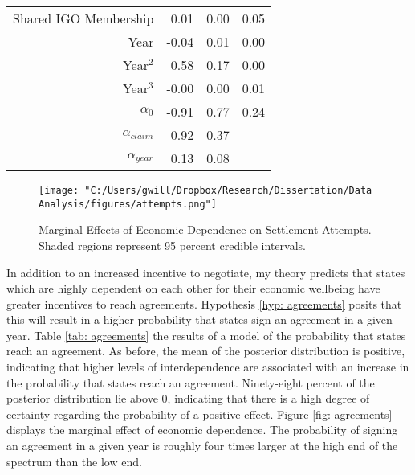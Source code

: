 \documentclass[../../dissertation.tex]{subfiles}
\begin{document}
\begin{table}[ht]
\begin{tabular}{rrrr}
Shared IGO Membership & 0.01 & 0.00 & 0.05 \\ 

Year & -0.04 & 0.01 & 0.00 \\ 

Year$^2$ & 0.58 & 0.17 & 0.00 \\ 

Year$^3$ & -0.00 & 0.00 & 0.01 \\ 

$\alpha_0$ & -0.91 & 0.77 & 0.24 \\ 

$\alpha_{claim}$ & 0.92 & 0.37 &  \\ 

$\alpha_{year}$ & 0.13 & 0.08 &  \\ 

\bottomrule

\end{tabular}

\end{table}



\begin{figure}
	\caption{Marginal Effects of Economic Dependence on Settlement Attempts. Shaded regions represent 95 percent credible intervals.}
	\label{fig: attempts}
	\texttt{[image: "C:/Users/gwill/Dropbox/Research/Dissertation/Data Analysis/figures/attempts.png"]}
\end{figure}

In addition to an increased incentive to negotiate, my theory predicts that states which are highly dependent on each other for their economic wellbeing have greater incentives to reach agreements. Hypothesis \ref{hyp: agreements} posits that this will result in a higher probability that states sign an agreement in a given year. Table \ref{tab: agreements} the results of a model of the probability that states reach an agreement. As before, the mean of the posterior distribution is positive, indicating that higher levels of interdependence are associated with an increase in the probability that states reach an agreement. Ninety-eight percent of the posterior distribution lie above 0, indicating that there is a high degree of certainty regarding the probability of a positive effect. Figure \ref{fig: agreements} displays the marginal effect of economic dependence. The probability of signing an agreement in a given year is roughly four times larger at the high end of the spectrum than the low end.
\end{document}
